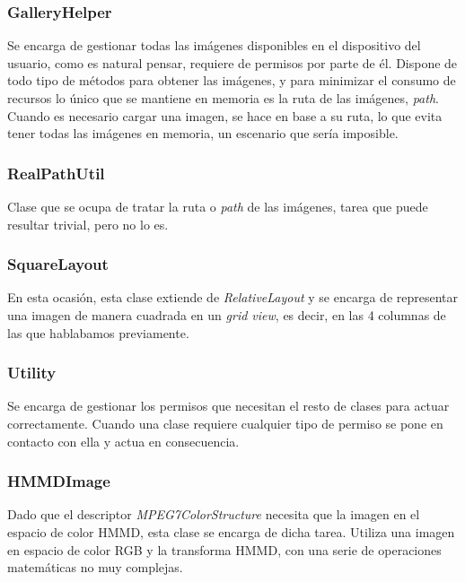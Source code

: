 \subsubsection{GalleryHelper}

Se encarga de gestionar todas las imágenes disponibles en el dispositivo del usuario, como es natural pensar, requiere de permisos por parte de él. Dispone de todo tipo de métodos para obtener las imágenes, y para minimizar el consumo de recursos lo único que se mantiene en memoria es la ruta de las imágenes, \textit{path}. Cuando es necesario cargar una imagen, se hace en base a su ruta, lo que evita tener todas las imágenes en memoria, un escenario que sería imposible.

\subsubsection{RealPathUtil}

Clase que se ocupa de tratar la ruta o \textit{path} de las imágenes, tarea que puede resultar trivial, pero no lo es.

\subsubsection{SquareLayout}

En esta ocasión, esta clase extiende de \textit{RelativeLayout} y se encarga de representar una imagen de manera cuadrada en un \textit{grid view}, es decir, en las 4 columnas de las que hablabamos previamente.

\subsubsection{Utility}

Se encarga de gestionar los permisos que necesitan el resto de clases para actuar correctamente. Cuando una clase requiere cualquier tipo de permiso se pone en contacto con ella y actua en consecuencia.

\subsubsection{HMMDImage}

Dado que el descriptor \textit{MPEG7ColorStructure} necesita que la imagen en el espacio de color HMMD, esta clase se encarga de dicha tarea. Utiliza una imagen en espacio de color RGB y la transforma HMMD, con una serie de operaciones matemáticas no muy complejas.

